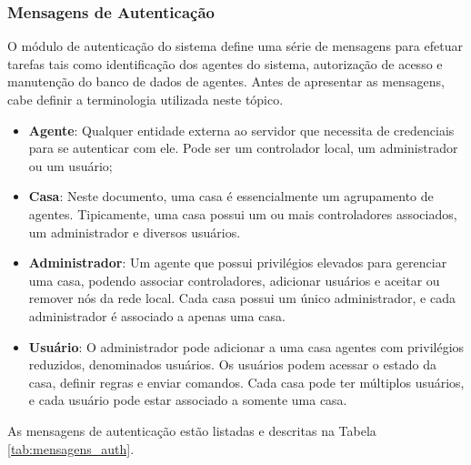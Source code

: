 \noindent
\begin{minipage}[l]{\linewidth}

\end{minipage}

\subsubsection{Mensagens de Autenticação}
O módulo de autenticação do sistema define uma série de mensagens para efetuar tarefas tais como identificação dos agentes do sistema, autorização de acesso e manutenção do banco de dados de agentes. Antes de apresentar as mensagens, cabe definir a terminologia utilizada neste tópico.
\begin{itemize}
	\item \textbf{Agente}: Qualquer entidade externa ao servidor que necessita de credenciais para se autenticar com ele. Pode ser um controlador local, um administrador ou um usuário;
	\item \textbf{Casa}: Neste documento, uma casa é essencialmente um agrupamento de agentes. Tipicamente, uma casa possui um ou mais controladores associados, um  administrador e diversos usuários.
	\item \textbf{Administrador}: Um agente que possui privilégios elevados para gerenciar uma casa, podendo associar controladores, adicionar usuários e aceitar ou remover nós da rede local. Cada casa possui um único administrador, e cada administrador é associado a apenas uma casa.
	\item \textbf{Usuário}: O administrador pode adicionar a uma casa agentes com privilégios reduzidos, denominados usuários. Os usuários podem acessar o estado da casa, definir regras e enviar comandos. Cada casa pode ter múltiplos usuários, e cada usuário pode estar associado a somente uma casa.
\end{itemize}

As mensagens de autenticação estão listadas e descritas na Tabela \ref{tab:mensagens_auth}.

